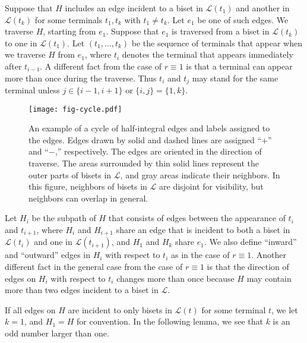 \documentclass{article}
\newcommand{\Lfam}{\mathcal{L}}
\begin{document}
  Suppose that $H$ includes an edge incident to a biset in
  $\Lfam(t_1)$ and another in $\Lfam(t_k)$ for some terminals
  $t_1,t_k$ with $t_1 \neq t_k$.
   Let $e_1$ be one of such edges.
   We traverse $H$, starting from $e_1$.
   Suppose that $e_1$ is traversed from a biset in $\Lfam(t_k)$ to one in
   $\Lfam(t_1)$.
   Let $(t_1,\ldots,t_k)$ be the
   sequence of terminals that appear when we traverse $H$ from $e_1$,
   where $t_i$ denotes the terminal that appears immediately after $t_{i-1}$.
   A different fact from the case of $r\equiv 1$ is that
   a terminal can appear more than once during the traverse.
   Thus $t_i$ and $t_j$ may stand for the same terminal unless $j \in
   \{i-1,i+1\}$ or $\{i,j\}=\{1,k\}$.

\begin{figure}
\centering
\texttt{[image: fig-cycle.pdf]}
\caption{An example of a cycle of half-integral edges and labels assigned to the edges. 
Edges drawn by 
solid and dashed lines are assigned ``$+$'' and ``$-$,'' respectively.
The edges are oriented in the direction of traverse. The areas surrounded by thin solid lines
represent the outer parts of bisets in $\Lfam$, and gray areas indicate their neighbors.
In this figure, neighbors of bisets in $\Lfam$ are disjoint for visibility, but neighbors can overlap
in general.}
\label{fig.cicle}
\end{figure}

Let $H_i$ be the subpath of $H$ that consists of edges
between the appearance of $t_i$ and $t_{i+1}$, where
$H_i$ and $H_{i+1}$ share an edge that is incident to both a biset in
$\Lfam(t_i)$ and one in $\Lfam(t_{i+1})$,
and $H_1$ and $H_k$ share $e_1$.
We also define ``inward'' and ``outward'' edges in $H_i$ with respect to
$t_i$
as in the case of $r \equiv 1$.
Another different fact in the general case from the case of $r\equiv 1$ is
that the direction of edges on $H_i$ with respect to $t_i$ changes more
than once because $H$ may contain more than two edges incident to a biset in $\Lfam$.

If all edges on $H$ are incident to only bisets in $\Lfam(t)$ for some
terminal $t$, we let $k=1$, and $H_1=H$ for convention.
In the following lemma, we see that $k$ is an odd number larger than one.
\end{document}
